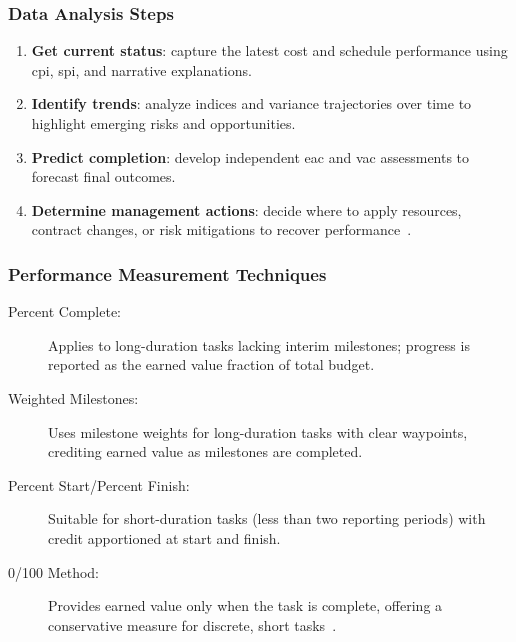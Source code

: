 \documentclass[../main.tex]{subfiles}
\begin{document}
\subsubsection{Data Analysis Steps}
\begin{enumerate}
	\item \textbf{Get current status}: capture the latest cost and schedule performance using \ac{cpi}, \ac{spi}, and narrative explanations.
	\item \textbf{Identify trends}: analyze indices and variance trajectories over time to highlight emerging risks and opportunities.
	\item \textbf{Predict completion}: develop independent \ac{eac} and \ac{vac} assessments to forecast final outcomes.
	\item \textbf{Determine management actions}: decide where to apply resources, contract changes, or risk mitigations to recover performance~\autocite{edo-3-6-2-evm-analysis-2025}.
\end{enumerate}
\subsubsection{Performance Measurement Techniques}
\begin{description}
	\item[Percent Complete:] Applies to long-duration tasks lacking interim milestones; progress is reported as the earned value fraction of total budget.
	\item[Weighted Milestones:] Uses milestone weights for long-duration tasks with clear waypoints, crediting earned value as milestones are completed.
	\item[Percent Start/Percent Finish:] Suitable for short-duration tasks (less than two reporting periods) with credit apportioned at start and finish.
	\item[0/100 Method:] Provides earned value only when the task is complete, offering a conservative measure for discrete, short tasks~\autocite{edo-3-6-2-evm-analysis-2025}.
\end{description}
\end{document}
